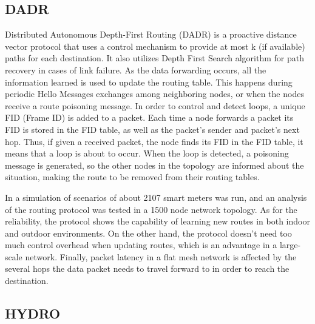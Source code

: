 \documentclass[11pt,draftclsnofoot,onecolumn]{IEEEtran}
\begin{document}
\subsection{DADR}\label{dadr}

Distributed Autonomous Depth-First Routing (DADR) \cite{Iwao2009} is a proactive distance vector protocol that uses a control mechanism to provide at most k (if available) paths for each destination. It also utilizes Depth First Search algorithm for path recovery in cases of link failure. As the data forwarding occurs, all the information learned is used to update the routing table. This happens during periodic Hello Messages exchanges among neighboring nodes, or when the nodes receive a route poisoning message. In order to control and detect loops, a unique FID (Frame ID) is added to a packet. Each time a node forwards a packet its FID is stored in the FID table, as well as the packet’s sender and packet’s next hop. Thus, if given a received packet, the node finds its FID in the FID table, it means that a loop is about to occur. When the loop is detected, a poisoning message is generated, so the other nodes in the topology are informed about the situation, making the route to be removed from their routing tables. 

In \cite{Iwao2010} a simulation of scenarios of about 2107 smart meters was run, and an analysis of the routing protocol was tested in a 1500 node network topology. As for the reliability, the protocol shows the capability of learning new routes in both indoor and outdoor environments. On the other hand, the protocol doesn’t need too much control overhead when updating routes, which is an advantage in a large-scale network. Finally, packet latency in a flat mesh network is affected by the several hops the data packet needs to travel forward to in order to reach the destination.

\subsection{HYDRO}\label{hydro}
\end{document}
